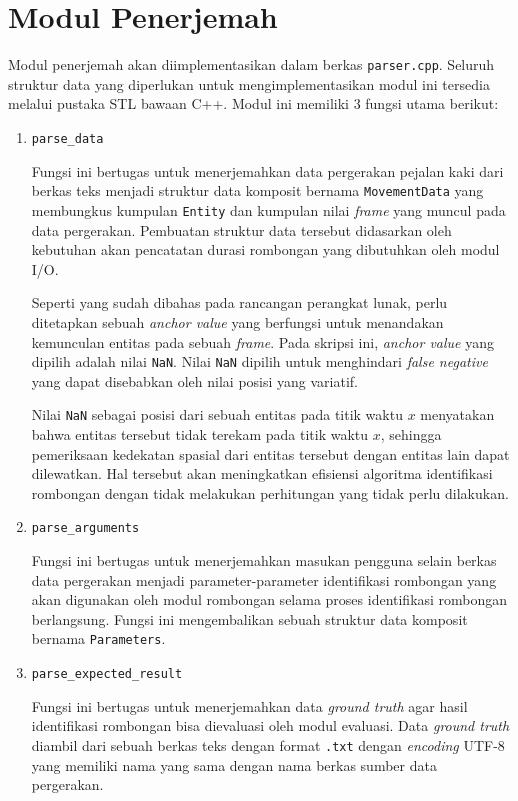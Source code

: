 \section{Modul Penerjemah}
\label{sec:impl-parser}

Modul penerjemah akan diimplementasikan dalam berkas \texttt{parser.cpp}. Seluruh struktur data yang diperlukan untuk mengimplementasikan modul ini tersedia melalui pustaka STL bawaan C++. Modul ini memiliki 3 fungsi utama berikut:

\begin{enumerate}
    \item \texttt{parse\_data}
    
    Fungsi ini bertugas untuk menerjemahkan data pergerakan pejalan kaki dari berkas teks menjadi struktur data komposit bernama \texttt{MovementData} yang membungkus kumpulan \texttt{Entity} dan kumpulan nilai \textit{frame} yang muncul pada data pergerakan. Pembuatan struktur data tersebut didasarkan oleh kebutuhan akan pencatatan durasi rombongan yang dibutuhkan oleh modul I/O.
    
    Seperti yang sudah dibahas pada rancangan perangkat lunak, perlu ditetapkan sebuah \textit{anchor value} yang berfungsi untuk menandakan kemunculan entitas pada sebuah \textit{frame}. Pada skripsi ini, \textit{anchor value} yang dipilih adalah nilai \texttt{NaN}. Nilai \texttt{NaN} dipilih untuk menghindari \textit{false negative} yang dapat disebabkan oleh nilai posisi yang variatif.

    Nilai \texttt{NaN} sebagai posisi dari sebuah entitas pada titik waktu $x$ menyatakan bahwa entitas tersebut tidak terekam pada titik waktu $x$, sehingga pemeriksaan kedekatan spasial dari entitas tersebut dengan entitas lain dapat dilewatkan. Hal tersebut akan meningkatkan efisiensi algoritma identifikasi rombongan dengan tidak melakukan perhitungan yang tidak perlu dilakukan. 
    
    \item \texttt{parse\_arguments}
    
    Fungsi ini bertugas untuk menerjemahkan masukan pengguna selain berkas data pergerakan menjadi parameter-parameter identifikasi rombongan yang akan digunakan oleh modul rombongan selama proses identifikasi rombongan berlangsung. Fungsi ini mengembalikan sebuah struktur data komposit bernama \texttt{Parameters}.
    
    \item \texttt{parse\_expected\_result}
    
    Fungsi ini bertugas untuk menerjemahkan data \textit{ground truth} agar hasil identifikasi rombongan bisa dievaluasi oleh modul evaluasi. Data \textit{ground truth} diambil dari sebuah berkas teks dengan format \texttt{.txt} dengan \textit{encoding} UTF-8 yang memiliki nama yang sama dengan nama berkas sumber data pergerakan. 
\end{enumerate}

